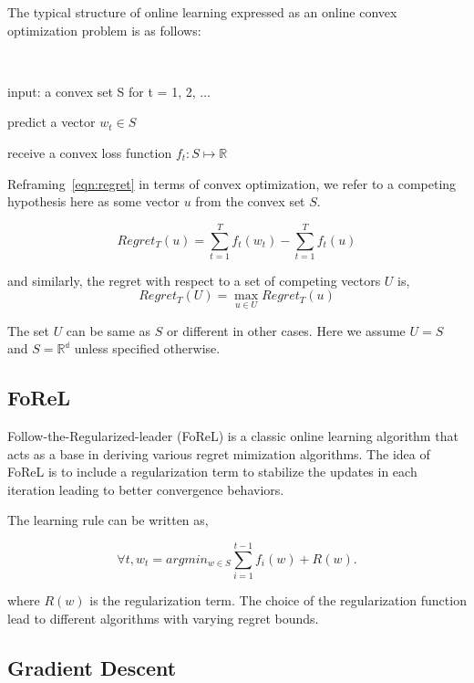 

The typical structure of online learning expressed as an online convex optimization problem is as
follows:

\begin{alprocedure}[H] ~\label{alg:oco}

	input: a convex set S for t = 1, 2, $\ldots$

	predict a
	vector $w_t \in S$

	receive a convex loss function $f_t: S \mapsto \mathbb{R}$
\end{alprocedure}

Reframing~\ref{eqn:regret} in terms of convex optimization,
we refer to a competing hypothesis here as some vector $u$ from the convex set $S$.

\begin{equation}
	Regret_T(u) = \sum_{t=1}^T f_t(w_t) - \sum_{t=1}^T f_t(u)
\end{equation}

and
similarly, the regret with respect to a set of competing vectors $U$ is,
\begin{equation}
	Regret_T(U) = \max_{u \in U} Regret_T(u)
\end{equation}

The set $U$ can be same
as $S$ or different in other cases.
Here we assume $U=S$ and $S=\mathbb{R^d}$ unless specified otherwise.

\subsection{FoReL}\label{sec:forel}

Follow-the-Regularized-leader (FoReL) is a classic online learning algorithm that acts as a base in
deriving various regret mimization algorithms.
The idea of FoReL is to include a regularization term to stabilize the updates in each iteration
leading to better convergence behaviors.

The learning rule can be written as,

$$\forall t, w_t = argmin_{w \in S}
	\sum_{i=1}^{t-1} f_i(w) + R(w).
$$

where $R(w)$ is the regularization term.
The choice of the regularization function lead to different algorithms with varying regret bounds.

\subsection{Gradient Descent}

